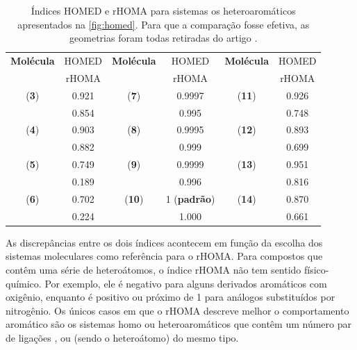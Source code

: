 \begin{table}[htb]
	\centering
	\caption{\label{tab:homed/homa} Índices \gls{HOMED} e \gls{rHOMA} para sistemas os heteroaromáticos apresentados na \autoref{fig:homed}. Para que a comparação fosse efetiva, as geometrias foram todas retiradas do artigo \cite{giov2020}.}
	\begin{tabular}{cccccc}
		\toprule
	\textbf{Molécula} & \gls{HOMED} & \textbf{Molécula} & \gls{HOMED} & \textbf{Molécula} & \gls{HOMED}
 \\
  & \gls{rHOMA} & & \gls{rHOMA} & & \gls{rHOMA}
 \\
		\midrule
    (\textbf{3}) & 0.921 & (\textbf{7}) & 0.9997 & (\textbf{11}) & 0.926 \\
    & 0.854 & & 0.995 & & 0.748 \\
    (\textbf{4}) & 0.903 & (\textbf{8}) & 0.9995  & (\textbf{12}) & 0.893 \\
    & 0.882 & & 0.999 & &  0.699 \\
    (\textbf{5}) & 0.749  & (\textbf{9}) & 0.9999 & (\textbf{13}) & 0.951 \\
    & 0.189 & & 0.996 & & 0.816 \\
    (\textbf{6}) & 0.702 & (\textbf{10}) & 1 (\textbf{padrão}) & (\textbf{14}) & 0.870  \\
    & 0.224 & & 1.000 & & 0.661 \\
    \bottomrule
	\end{tabular}
\end{table}

As discrepâncias entre os dois índices acontecem em função da escolha dos sistemas moleculares como referência para o \gls{rHOMA}. Para compostos que contêm uma série de heteroátomos, o índice \gls{rHOMA} não tem sentido físico-químico. Por exemplo, ele é negativo para alguns derivados aromáticos com oxigênio, enquanto é positivo ou próximo de 1 para análogos substituídos por nitrogênio. Os únicos casos em que o \gls{rHOMA} descreve melhor o comportamento aromático são os sistemas homo ou heteroaromáticos que contêm um número par de ligações ,  ou  (sendo  o heteroátomo) do mesmo tipo.

